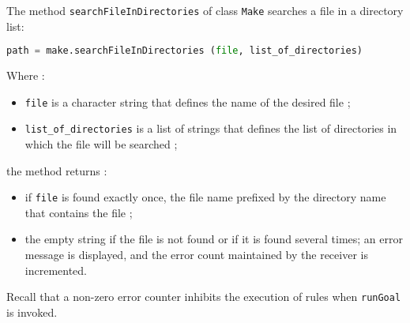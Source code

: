\documentclass[a4paper,11pt]{extarticle}
\begin{document}
The method \texttt{searchFileInDirectories} of class \texttt{Make} searches a file in a directory list:
\begin{lstlisting}[language=py]
path = make.searchFileInDirectories (file, list_of_directories)
\end{lstlisting}
Where :
\begin{itemize}
  \item \texttt{file} is a character string that defines the name of the desired file ;
  \item \texttt{list\_of\_directories} is a list of strings that defines the list of directories in which the file will be searched ;
\end{itemize}
the method returns :
\begin{itemize}
  \item if \texttt{file} is found exactly once, the file name prefixed by the directory name that contains the file ;
  \item the empty string if the file is not found or if it is found several times; an error message is displayed, and the error count maintained by the receiver is incremented.
\end{itemize}

Recall that a non-zero error counter inhibits the execution of rules when \texttt{runGoal}  is invoked.

\end{document}
